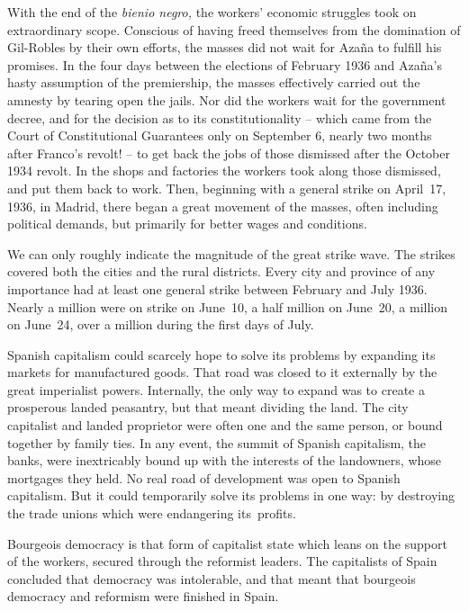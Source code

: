 With the end of the \emph{bienio negro,} the workers’ economic struggles took on extraordinary scope. Conscious of having freed themselves from the domination of Gil-Robles by their own efforts, the masses did not wait for Azaña to fulfill his promises. In the four days between the elections of February 1936 and Azaña’s hasty assumption of the premiership, the masses effectively carried out the amnesty by tearing open the jails. Nor did the workers wait for the government decree, and for the decision as to its constitutionality -- which came from the Court of Constitutional Guarantees only on September 6, nearly two months after Franco’s revolt! -- to get back the jobs of those dismissed after the October 1934 revolt. In the shops and factories the workers took along those dismissed, and put them back to work. Then, beginning with a general strike on April~17, 1936, in Madrid, there began a great movement of the masses, often including political demands, but primarily for better wages and conditions.%

We can only roughly indicate the magnitude of the great strike wave. The strikes covered both the cities and the rural districts. Every city and province of any importance had at least one general strike between February and July 1936. Nearly a million were on strike on June~10, a half million on June~20, a million on June~24, over a million during the first days of July.

Spanish capitalism could scarcely hope to solve its problems by expanding its markets for manufactured goods. That road was closed to it externally by the great imperialist powers. Internally, the only way to expand was to create a prosperous landed peasantry, but that meant dividing the land. The city capitalist and landed proprietor were often one and the same person, or bound together by family ties. In any event, the summit of Spanish capitalism, the banks, were inextricably bound up with the interests of the landowners, whose mortgages they held. No real road of development was open to Spanish capitalism. But it could temporarily solve its problems in one way: by destroying the trade unions which were endangering its~profits.

Bourgeois democracy is that form of capitalist state which leans on the support of the workers, secured through the reformist leaders. The capitalists of Spain concluded that democracy was intolerable, and that meant that bourgeois democracy and reformism were finished in Spain.

